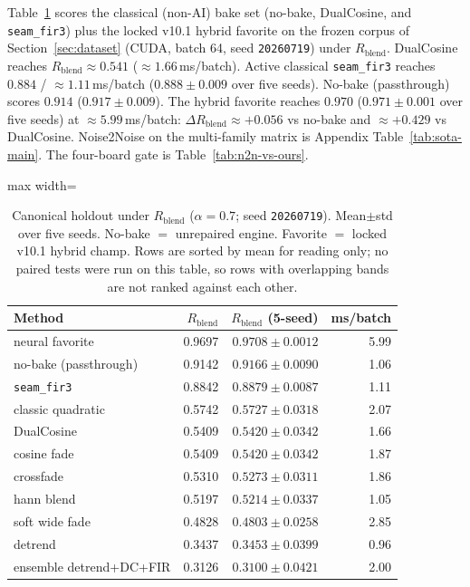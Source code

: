 \label{sec:classical-vs-favorite}
Table~\ref{tab:canonical-methods} scores the classical (non-AI) bake set (no-bake, DualCosine, and \texttt{seam\_fir3}) plus the locked v10.1 hybrid favorite on the frozen corpus of Section~\ref{sec:dataset} (CUDA, batch 64, seed \texttt{20260719}) under $R_{\mathrm{blend}}$.
DualCosine reaches $R_{\mathrm{blend}}\approx 0.541$ ($\approx 1.66$\,ms/batch).
Active classical \texttt{seam\_fir3} reaches $0.884$ / $\approx 1.11$\,ms/batch ($0.888\pm0.009$ over five seeds).
No-bake (passthrough) scores $0.914$ ($0.917\pm0.009$).
The hybrid favorite reaches $0.970$ ($0.971\pm0.001$ over five seeds) at $\approx 5.99$\,ms/batch:
$\Delta R_{\mathrm{blend}} \approx {+}0.056$ vs no-bake and $\approx {+}0.429$ vs DualCosine.
Noise2Noise on the multi-family matrix is Appendix Table~\ref{tab:sota-main}. The four-board gate is Table~\ref{tab:n2n-vs-ours}.

\begin{table}[htbp]
  \centering
  \caption{Canonical holdout under $R_{\mathrm{blend}}$ ($\alpha{=}0.7$; seed \texttt{20260719}). Mean$\pm$std over five seeds. No-bake $=$ unrepaired engine. Favorite $=$ locked v10.1 hybrid champ. Rows are sorted by mean for reading only; no paired tests were run on this table, so rows with overlapping bands are not ranked against each other.}
  \label{tab:canonical-methods}
  \setlength{\tabcolsep}{6pt}
  \begin{adjustbox}{max width=\columnwidth}
\begin{tabular}{@{}lrrr@{}}
    \toprule
    Method & $R_{\mathrm{blend}}$ & $R_{\mathrm{blend}}$ (5-seed) & ms/batch \\
    \midrule
    neural favorite & 0.9697 & $0.9708\pm0.0012$ & 5.99 \\
    no-bake (passthrough) & 0.9142 & $0.9166\pm0.0090$ & 1.06 \\
    \texttt{seam\_fir3} & 0.8842 & $0.8879\pm0.0087$ & 1.11 \\
    classic quadratic & 0.5742 & $0.5727\pm0.0318$ & 2.07 \\
    DualCosine & 0.5409 & $0.5420\pm0.0342$ & 1.66 \\
    cosine fade & 0.5409 & $0.5420\pm0.0342$ & 1.87 \\
    crossfade & 0.5310 & $0.5273\pm0.0311$ & 1.86 \\
    hann blend & 0.5197 & $0.5214\pm0.0337$ & 1.05 \\
    soft wide fade & 0.4828 & $0.4803\pm0.0258$ & 2.85 \\
    detrend & 0.3437 & $0.3453\pm0.0399$ & 0.96 \\
    ensemble detrend{+}DC{+}FIR & 0.3126 & $0.3100\pm0.0421$ & 2.00 \\
    \bottomrule
  \end{tabular}
\end{adjustbox}
\end{table}



